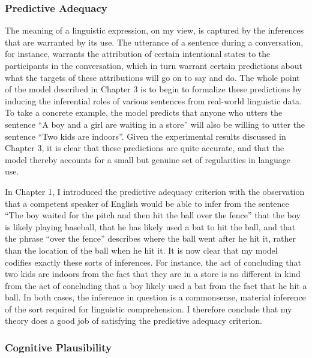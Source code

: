 \subsubsection{Predictive Adequacy}

The meaning of a linguistic expression, on my view, is captured by the inferences that are warranted by its use. The utterance of a sentence during a conversation, for instance, warrants the attribution of certain intentional states to the participants in the conversation, which in turn warrant certain predictions about what the targets of these attributions will go on to say and do. The whole point of the model described in Chapter 3 is to begin to formalize these predictions by inducing the inferential roles of various sentences from real-world linguistic data. To take a concrete example, the model predicts that anyone who utters the sentence ``A boy and a girl are waiting in a store'' will also be willing to utter the sentence ``Two kids are indoors''. Given the experimental results discussed in Chapter 3, it is clear that these predictions are quite accurate, and that the model thereby accounts for a small but genuine set of regularities in language use. 

In Chapter 1, I introduced the predictive adequacy criterion with the observation that a competent speaker of English would be able to infer from the sentence ``The boy waited for the pitch and then hit the ball over the fence'' that the boy is likely playing baseball, that he has likely used a bat to hit the ball, and that the phrase ``over the fence'' describes where the ball went after he hit it, rather than the location of the ball when he hit it. It is now clear that my model codifies exactly these sorts of inferences. For instance, the act of concluding that two kids are indoors from the fact that they are in a store is no different in kind from the act of concluding that a boy likely used a bat from the fact that he hit a ball. In both cases, the inference in question is a commonsense, material inference of the sort required for linguistic comprehension. I therefore conclude that my theory does a good job of satisfying the predictive adequacy criterion. 

\subsubsection{Cognitive Plausibility}

